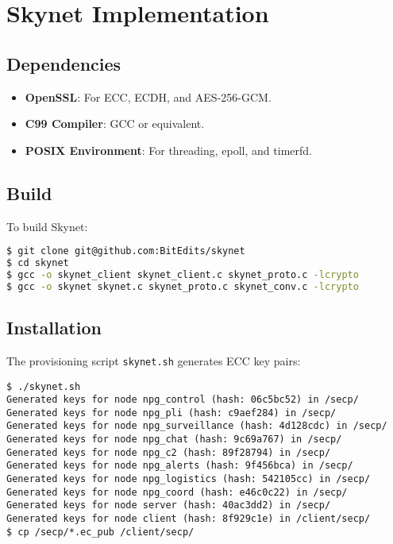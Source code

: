 \documentclass{article}
\begin{document}
\section{Skynet Implementation}

\subsection{Dependencies}
\begin{itemize}
    \item \textbf{OpenSSL}: For ECC, ECDH, and AES-256-GCM.
    \item \textbf{C99 Compiler}: GCC or equivalent.
    \item \textbf{POSIX Environment}: For threading, epoll, and timerfd.
\end{itemize}

\subsection{Build}
To build Skynet:
\begin{lstlisting}[language=bash]
$ git clone git@github.com:BitEdits/skynet
$ cd skynet
$ gcc -o skynet_client skynet_client.c skynet_proto.c -lcrypto
$ gcc -o skynet skynet.c skynet_proto.c skynet_conv.c -lcrypto
\end{lstlisting}

\newpage
\subsection{Installation}
The provisioning script \texttt{skynet.sh} generates ECC key pairs:
\begin{lstlisting}
$ ./skynet.sh
Generated keys for node npg_control (hash: 06c5bc52) in /secp/
Generated keys for node npg_pli (hash: c9aef284) in /secp/
Generated keys for node npg_surveillance (hash: 4d128cdc) in /secp/
Generated keys for node npg_chat (hash: 9c69a767) in /secp/
Generated keys for node npg_c2 (hash: 89f28794) in /secp/
Generated keys for node npg_alerts (hash: 9f456bca) in /secp/
Generated keys for node npg_logistics (hash: 542105cc) in /secp/
Generated keys for node npg_coord (hash: e46c0c22) in /secp/
Generated keys for node server (hash: 40ac3dd2) in /secp/
Generated keys for node client (hash: 8f929c1e) in /client/secp/
$ cp /secp/*.ec_pub /client/secp/
\end{lstlisting}
\end{document}
